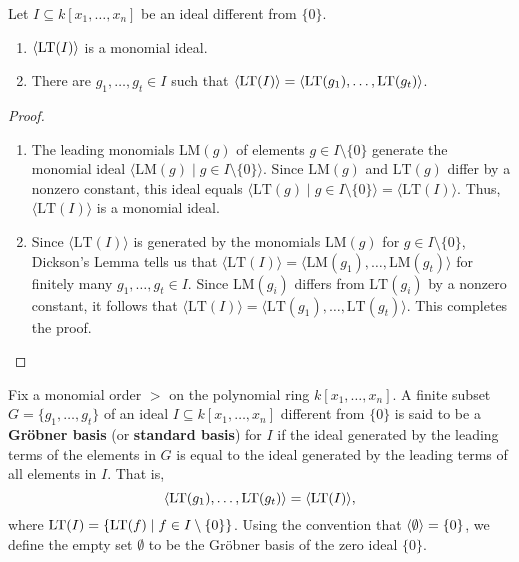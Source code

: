 \begin{theorem} %
    \label{thm:initialIdeal_is_FG}
    \leanok %
    Let $I \subseteq k[x_1, \ldots , x_n]$ be an ideal different from $\{ 0 \}$.
    \begin{enumerate}
        \item $\langle\operatorname{LT}(I)\rangle$ is a monomial ideal.
        \item There are $g_1, \ldots , g_t \in I$ such that $\langle \operatorname{LT}(I)\rangle = \langle \operatorname{LT}(g_1), \ldots , \operatorname{LT}(g_t)\rangle$.
    \end{enumerate}
\end{theorem}
\begin{proof}
\leanok
\begin{enumerate}
    \item The leading monomials $\text{LM}(g)$ of elements $g \in I \setminus \{0\}$ generate the monomial ideal $\langle \text{LM}(g) \mid g \in I \setminus \{0\} \rangle$. 
      Since $\text{LM}(g)$ and $\text{LT}(g)$ differ by a nonzero constant, this ideal equals $\langle \text{LT}(g) \mid g \in I \setminus \{0\} \rangle = \langle \text{LT}(I) \rangle$. 
      Thus, $\langle \text{LT}(I) \rangle$ is a monomial ideal.
    \item Since $\langle \text{LT}(I) \rangle$ is generated by the monomials $\text{LM}(g)$ for $g \in I \setminus \{0\}$, Dickson's Lemma tells us that $\langle \text{LT}(I) \rangle = \langle \text{LM}(g_1), \dots, \text{LM}(g_t) \rangle$ for finitely many $g_1, \dots, g_t \in I$. 
      Since $\text{LM}(g_i)$ differs from $\text{LT}(g_i)$ by a nonzero constant, it follows that $\langle \text{LT}(I) \rangle = \langle \text{LT}(g_1), \dots, \text{LT}(g_t) \rangle$. 
      This completes the proof.
\end{enumerate}
\end{proof}

\begin{definition}\label{def:Groebner_basis}
    \leanok %
    Fix a monomial order $>$ on the polynomial ring $k[x_1, \dots, x_n]$. 
    A finite subset $G = \{g_1, \dots, g_t\}$ of an ideal $I \subseteq k[x_1, \dots, x_n]$ different from $\{0\}$ 
    is said to be a \textbf{Gr{\"o}bner basis} (or \textbf{standard basis}) for $I$ if the ideal generated by the
    leading terms of the elements in $G$ is equal to the ideal generated by the leading terms of all elements in $I$.
    That is,
    \[ \langle \operatorname{LT}(g_1), \dots, \operatorname{LT}(g_t) \rangle = \langle \operatorname{LT}(I) \rangle, \]
    where $\operatorname{LT}(I) = \{\operatorname{LT}(f) \mid f \in I \setminus \{0\}\}$.
    Using the convention that $\langle \emptyset \rangle = \{0\}$, we define the empty set $\emptyset$
    to be the Gr{\"o}bner basis of the zero ideal $\{0\}$.
\end{definition}

